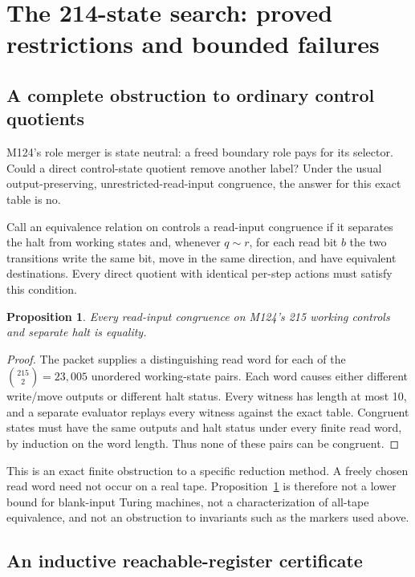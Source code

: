 \documentclass[11pt]{article}
\newtheorem{proposition}[theorem]{Proposition}
\theoremstyle{remark}\newtheorem{remark}[theorem]{Remark}
\begin{document}
\section{The 214-state search: proved restrictions and bounded failures}

\subsection{A complete obstruction to ordinary control quotients}

M124's role merger is state neutral: a freed boundary role pays for its selector. Could a direct control-state quotient remove another label? Under the usual output-preserving, unrestricted-read-input congruence, the answer for this exact table is no.

Call an equivalence relation on controls a read-input congruence if it separates the halt from working states and, whenever $q\sim r$, for each read bit $b$ the two transitions write the same bit, move in the same direction, and have equivalent destinations. Every direct quotient with identical per-step actions must satisfy this condition.

\begin{proposition}\label{prop:quotient}
Every read-input congruence on M124's 215 working controls and separate halt is equality.
\end{proposition}
\begin{proof}
The packet supplies a distinguishing read word for each of the $\binom{215}{2}=23,005$ unordered working-state pairs. Each word causes either different write/move outputs or different halt status. Every witness has length at most 10, and a separate evaluator replays every witness against the exact table. Congruent states must have the same outputs and halt status under every finite read word, by induction on the word length. Thus none of these pairs can be congruent.
\end{proof}

This is an exact finite obstruction to a specific reduction method. A freely chosen read word need not occur on a real tape. Proposition~\ref{prop:quotient} is therefore not a lower bound for blank-input Turing machines, not a characterization of all-tape equivalence, and not an obstruction to invariants such as the markers used above.

\subsection{An inductive reachable-register certificate}
\end{document}
